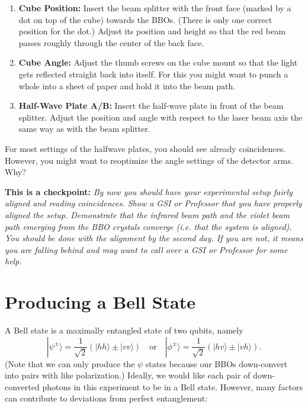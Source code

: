 \documentclass{../lab}
\begin{document}
\begin{enumerate}
    \item \textbf{Cube Position:} Insert the beam splitter with the front face (marked by a dot on top of the cube) towards the BBOs. (There is only one correct position for the dot.) Adjust its position and height so that the red beam passes roughly through the center of the back face.

    \item \textbf{Cube Angle:} Adjust the thumb screws on the cube mount so that the light gets reflected straight back into itself. For this you might want to punch a whole into a sheet of paper and hold it into the beam path.

    \item \textbf{Half-Wave Plate A/B:} Insert the half-wave plate in front of the beam splitter. Adjust the position and angle with respect to the laser beam axis the same way as with the beam splitter.
\end{enumerate}

For most settings of the halfwave plates, you should see already coincidences. However, you might want to reoptimize the angle settings of the detector arms. Why?

\textbf{This is a checkpoint:} \emph{By now you should have your experimental setup fairly aligned and reading coincidences. Show a GSI or Professor that you have properly aligned the setup. Demonstrate that the infrared beam path and the violet beam path emerging from the BBO crystals converge (i.e. that the system is aligned). You should be done with the alignment by the second day. If you are not, it means you are falling behind and may want to call over a GSI or Professor for some help.}

\section{Producing a Bell State}

A Bell state is a maximally entangled state of two qubits, namely
\begin{equation}
    |\psi^\pm\rangle = \frac{1}{\sqrt{2}}(|hh\rangle \pm |vv\rangle)
    \quad \text{or} \quad
    |\phi^\pm\rangle = \frac{1}{\sqrt{2}}(|hv\rangle \pm |vh\rangle).
\end{equation}
(Note that we can only produce the $\psi$ states because our BBOs down-convert into pairs with like polarization.) Ideally, we would like each pair of down-converted photons in this experiment to be in a Bell state. However, many factors can contribute to deviations from perfect entanglement:
\end{document}
